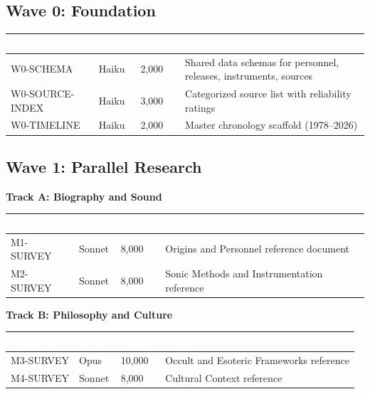 \documentclass[11pt,letterpaper]{article}
\newcommand{\tableheader}[1]{\textbf{\sffamily\textcolor{white}{#1}}}
\begin{document}
\subsection{Wave 0: Foundation}

\begin{center}
\begin{tabularx}{\textwidth}{L{3cm}C{1.5cm}C{1.5cm}X}
\toprule
{}
\tableheader{Component} & \tableheader{Model} & \tableheader{Tokens} & \tableheader{Output} \\
\midrule
W0-SCHEMA & Haiku & 2,000 & Shared data schemas for personnel, releases, instruments, sources \\
W0-SOURCE-INDEX & Haiku & 3,000 & Categorized source list with reliability ratings \\
W0-TIMELINE & Haiku & 2,000 & Master chronology scaffold (1978--2026) \\
\bottomrule
\end{tabularx}
\end{center}

\subsection{Wave 1: Parallel Research}

\textbf{Track A: Biography and Sound}

\begin{center}
\begin{tabularx}{\textwidth}{L{3cm}C{1.5cm}C{1.5cm}X}
\toprule
{}
\tableheader{Component} & \tableheader{Model} & \tableheader{Tokens} & \tableheader{Output} \\
\midrule
M1-SURVEY & Sonnet & 8,000 & Origins and Personnel reference document \\
M2-SURVEY & Sonnet & 8,000 & Sonic Methods and Instrumentation reference \\
\bottomrule
\end{tabularx}
\end{center}

\textbf{Track B: Philosophy and Culture}

\begin{center}
\begin{tabularx}{\textwidth}{L{3cm}C{1.5cm}C{1.5cm}X}
\toprule
{}
\tableheader{Component} & \tableheader{Model} & \tableheader{Tokens} & \tableheader{Output} \\
\midrule
M3-SURVEY & Opus & 10,000 & Occult and Esoteric Frameworks reference \\
M4-SURVEY & Sonnet & 8,000 & Cultural Context reference \\
\bottomrule
\end{tabularx}
\end{center}
\end{document}
